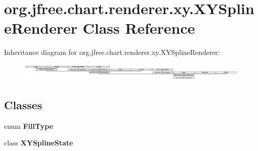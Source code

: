 \hypertarget{classorg_1_1jfree_1_1chart_1_1renderer_1_1xy_1_1_x_y_spline_renderer}{}\section{org.\+jfree.\+chart.\+renderer.\+xy.\+X\+Y\+Spline\+Renderer Class Reference}
\label{classorg_1_1jfree_1_1chart_1_1renderer_1_1xy_1_1_x_y_spline_renderer}
Inheritance diagram for org.\+jfree.\+chart.\+renderer.\+xy.\+X\+Y\+Spline\+Renderer\+:\begin{figure}[H]
\begin{center}
\leavevmode
\includegraphics[height=0.845922cm]{classorg_1_1jfree_1_1chart_1_1renderer_1_1xy_1_1_x_y_spline_renderer}
\end{center}
\end{figure}
\subsection*{Classes}
\begin{DoxyCompactItemize}
\item 
enum {\bfseries Fill\+Type}
\item 
class {\bfseries X\+Y\+Spline\+State}
\end{DoxyCompactItemize}
